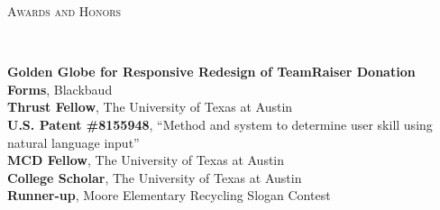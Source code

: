 \documentclass[9pt]{article}
\newenvironment{changemargin}[2]{%
  \begin{list}{}{%
    \setlength{\topsep}{0pt}%
    \setlength{\leftmargin}{#1}%
    \setlength{\rightmargin}{#2}%
    \setlength{\listparindent}{\parindent}%
    \setlength{\itemindent}{\parindent}%
    \setlength{\parsep}{\parskip}%
  }%
  \item[]}{\end{list}
}
\newcommand{\lineover}{
	\begin{changemargin}{-0.05in}{-0.05in}
		\vspace*{-8pt}
		\hrulefill \\
		\vspace*{-2pt}
	\end{changemargin}
}
\newcommand{\header}[1]{
	\begin{changemargin}{-0.5in}{-0.5in}
		\scshape{#1}\\
  	\lineover
	\end{changemargin}
}
\newenvironment{body} {
	\vspace*{-16pt}
	\begin{changemargin}{-0.25in}{-0.5in}
  }	
	{\end{changemargin}
}
\begin{document}
\medskip


\header{Awards and Honors}

\begin{body}
	\vspace{14pt}
	\textbf{Golden Globe for Responsive Redesign of TeamRaiser Donation Forms}, Blackbaud\\
	\medskip
	\textbf{Thrust Fellow}, The University of Texas at Austin\\
	\medskip
	\textbf{U.S. Patent \#8155948}, ``Method and system to determine user skill using natural language input''\\
	\medskip
	\textbf{MCD Fellow}, The University of Texas at Austin\\
	\medskip
	\textbf{College Scholar}, The University of Texas at Austin\\
	\medskip
	\textbf{Runner-up}, Moore Elementary Recycling Slogan Contest\\
\end{body}
\end{document}
